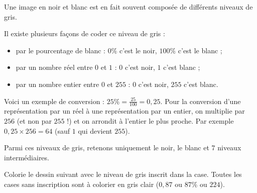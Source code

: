 \documentclass[class=report,crop=false, 12pt]{standalone}
\begin{document}
\begin{activite}

Une image en \og noir et blanc \fg{} est en fait souvent composée de différents niveaux de gris.



Il existe plusieurs façons de coder ce niveau de gris :
\begin{itemize}
  \item par le pourcentage de blanc : $0\%$ c'est le noir, $100\%$ c'est le blanc ;
  \item par un nombre réel entre $0$ et $1$ : $0$ c'est noir, $1$ c'est blanc ;
  \item par un nombre entier entre $0$ et $255$ : $0$ c'est noir, $255$ c'est blanc.
\end{itemize}

Voici un exemple de conversion : $25\% = \frac{25}{100} = 0,25$.
Pour la conversion d'une représentation par un réel à une représentation par un entier, on multiplie par $256$ (et non par $255$ !) et on arrondit à l'entier le plus proche. Par exemple
$0,25 \times 256 = 64$ (sauf $1$ qui devient $255$).

Parmi ces niveaux de gris, retenons uniquement le noir, le blanc et $7$ niveaux intermédiaires.

Colorie le dessin suivant avec le niveau de gris inscrit dans la case.
Toutes les cases sans inscription sont à colorier en gris clair ($0,87$ ou $87 \%$ ou $224$).


\end{activite}
\end{document}
